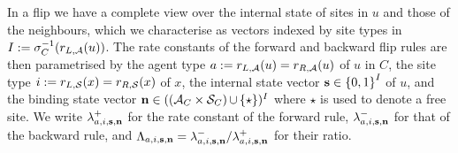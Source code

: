 In a flip we have a complete view
over the internal state of sites in $u$
and those of the neighbours,
which we characterise as vectors indexed by site types
in $I := \sigma_C^{-1}(r_{L,\mathcal{A}}(u))$.
The rate constants of the forward and backward
flip rules are then parametrised by the agent type
$a := r_{L,\mathcal{A}}(u) = r_{R,\mathcal{A}}(u)$ of $u$ in $C$,
the site type $i := r_{L,\mathcal{S}}(x) = r_{R,\mathcal{S}}(x)$ of $x$,
the internal state vector $\boldsymbol{\mathbf{s}} \in \left\{ 0,1 \right\}^I$ of $u$,
and the binding state vector $\boldsymbol{\mathbf{n}} \in
((\mathcal{A}_C \times \mathcal{S}_C) \operatorname*{\cup} \left\{ \star \right\})^I$
where $\star$ is used to denote a free site.
We write $\lambda^+_{a,i,\boldsymbol{\mathbf{s}},\boldsymbol{\mathbf{n}}}$
for the rate constant of the forward rule,
$\lambda^-_{a,i,\boldsymbol{\mathbf{s}},\boldsymbol{\mathbf{n}}}$
for that of the backward rule,
and $\Lambda_{a,i,\boldsymbol{\mathbf{s}},\boldsymbol{\mathbf{n}}} =
\lambda^-_{a,i,\boldsymbol{\mathbf{s}},\boldsymbol{\mathbf{n}}}/
\lambda^+_{a,i,\boldsymbol{\mathbf{s}},\boldsymbol{\mathbf{n}}}$ for their ratio.


